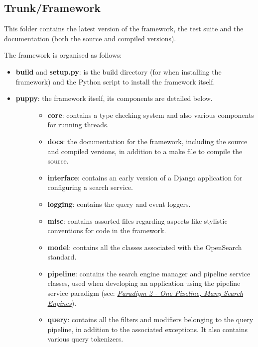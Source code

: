 \documentclass[letterpaper,10pt,english]{sphinxmanual}
\begin{document}
\subsection{Trunk/Framework}
\label{repo:trunk-framework}
This folder contains the latest version of the framework, the test suite and the documentation (both the source and compiled versions).

The framework is organised as follows:
\begin{itemize}
\item {} 
\textbf{build} and \textbf{setup.py}: is the build directory (for when installing the framework) and the Python script to install the framework itself.

\item {} \begin{description}
\item[{\textbf{puppy}: the framework itself, its components are detailed below.}] \leavevmode\begin{itemize}
\item {} 
\textbf{core}: contains a type checking system and also various components for running threads.

\item {} 
\textbf{docs}: the documentation for the framework, including the source and compiled versions, in addition to a make file to compile the source.

\item {} 
\textbf{interface}: contains an early version of a Django application for configuring a search service.

\item {} 
\textbf{logging}: contains the query and event loggers.

\item {} 
\textbf{misc}: contains assorted files regarding aspects like stylistic conventions for code in the framework.

\item {} 
\textbf{model}: contains all the classes associated with the OpenSearch standard.

\item {} 
\textbf{pipeline}: contains the search engine manager and pipeline service classes, used when developing an application using the pipeline service paradigm (see: {\hyperref[pipeline:pipeline-architecture]{\emph{Paradigm 2 - One Pipeline, Many Search Engines}}}).

\item {} 
\textbf{query}: contains all the filters and modifiers belonging to the query pipeline, in addition to the associated exceptions. It also contains various query tokenizers.


\end{itemize}
\end{description}
\end{itemize}
\end{document}
